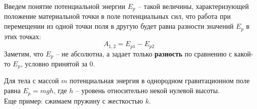 \documentclass[12pt,epsfig,color,russian]{article}
\begin{document}
Введем понятие потенциальной энергии $E_p$ -- такой величины, характери\-зующей положение материальной точки в поле потенциальных сил, что работа при перемещении из одной точки поля в другую будет равна разности значений $E_{p}$ в этих точках:
   \begin{displaymath}
   A_{1,2}=E_{p1}-E_{p2}
   \end{displaymath}
Заметим, что $E_p$ -- не абсолютна, а задает только {\bf разность} по сравнению с какой-то $E_p$, условно принятой за 0.

Для тела с массой $m$ потенциальная энергия в однородном гравитационном поле равна $E_p=mgh$, где $h$ -- уровень относительно некой нулевой высоты.\\

Еще пример: сжимаем пружину с жесткостью $k$.\\
\end{document}
